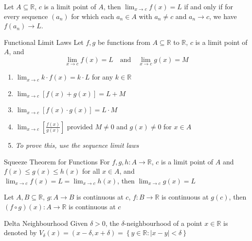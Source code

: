 \documentclass[12pt]{article}
\begin{document}
\begin{theorem}{}{}
    Let $ A \subseteq \mathbb{R} $, $ c $ is a limit point of $ A $, then $ \lim_{x \to c} f \left( x \right) = L $ if and only if for every sequence $ \left( a_n \right) $ for which each $ a_n \in A $ with $ a_n \neq c $ and $ a_n \to c $, we have $ f \left( a_n \right) \to L $.
\end{theorem}
\begin{laws}{Functional Limit Laws}{}
    Let $ f, g $ be functions from $ A \subseteq \mathbb{R} $ to $ \mathbb{R} $, $ c $ is a limit point of $ A $, and
    \[ \lim_{x \to c} f \left( x \right) = L \quad \text{and} \quad \lim_{x \to c} g \left( x \right) = M \]
    \begin{enumerate}
        \item $ \lim_{x \to c} k \cdot f \left( x \right) = k \cdot L $ for any $ k \in \mathbb{R} $
        \item $ \lim_{x \to c} \left[ f \left( x \right) + g \left( x \right) \right] = L + M $
        \item $ \lim_{x \to c} \left[ f \left( x \right) \cdot g \left( x \right) \right] = L \cdot M $
        \item $ \lim_{x \to c} \left[ \frac{f \left( x \right)}{g \left( x \right)} \right] $ provided $ M \neq 0 $ and $ g \left( x \right) \neq 0 $ for $ x \in A $
        \item \textit{To prove this, use the sequence limit laws}
    \end{enumerate}
\end{laws}
\begin{theorem}{Squeeze Theorem for Functions}{}
    For $ f, g, h : A \to \mathbb{R} $, $ c $ is a limit point of $ A $ and $ f \left( x \right) \leq g \left( x \right) \leq h \left( x \right) $ for all $ x \in A $, and $ \lim_{x \to c} f \left( x \right) = L = \lim_{x \to c} h \left( x \right) $, then $ \lim_{x \to c} g \left( x \right) = L $
\end{theorem}
\begin{proposition}{}{}
    Let $ A, B \subseteq \mathbb{R} $, $ g : A \to B $ is continuous at $ c $, $ f : B \to \mathbb{R} $ is continuous at $ g \left( c \right) $, then $ \left( f \circ g \right) \left( x \right) : A \to \mathbb{R} $ is continuous at $ c $
\end{proposition}
\begin{definition}{Delta Neighbourhood}{}
    Given $ \delta > 0 $, the $ \delta $-neighbourhood of a point $ x \in \mathbb{R} $ is denoted by $ V_\delta \left( x \right) = \left( x - \delta, x + \delta \right) = \left\{ y \in \mathbb{R} : | x - y | < \delta \right\} $
\end{definition}
\end{document}
